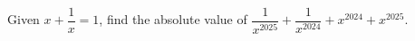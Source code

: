 Given $x + \dfrac{1}{x} = 1$, find the absolute value of $\dfrac{1}{x^{2025}} + \dfrac{1}{x^{2024}} + x^{2024} + x^{2025}.$
